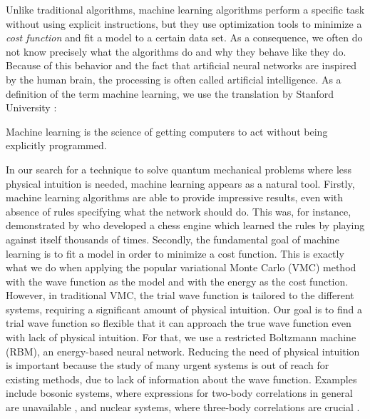 Unlike traditional algorithms, machine learning algorithms perform a specific task without using explicit instructions, but they use optimization tools to minimize a \textit{cost function} and fit a model to a certain data set. As a consequence, we often do not know precisely what the algorithms do and why they behave like they do. Because of this behavior and the fact that artificial neural networks are inspired by the human brain, the processing is often called artificial intelligence. As a definition of the term machine learning, we use the translation by Stanford University \supercite{noauthor_machine_nodate}:

\begin{shadequote}{}
	Machine learning is the science of getting computers to act without being explicitly programmed.
\end{shadequote}

In our search for a technique to solve quantum mechanical problems where less physical intuition is needed, machine learning appears as a natural tool. Firstly, machine learning algorithms are able to provide impressive results, even with absence of rules specifying what the network should do. This was, for instance, demonstrated by \citet{silver2017mastering} who developed a chess engine which learned the rules by playing against itself thousands of times. Secondly, the fundamental goal of machine learning is to fit a model in order to minimize a cost function. This is exactly what we do when applying the popular variational Monte Carlo (VMC) method with the wave function as the model and with the energy as the cost function. However, in traditional VMC, the trial wave function is tailored to the different systems, requiring a significant amount of physical intuition. Our goal is to find a trial wave function so flexible that it can approach the true wave function even with lack of physical intuition. For that, we use a restricted Boltzmann machine (RBM), an energy-based neural network. Reducing the need of physical intuition is important because the study of many urgent systems is out of reach for existing methods, due to lack of information about the wave function. Examples include bosonic systems, where expressions for two-body correlations in general are unavailable \supercite{holzmann_pair_1999}, and nuclear systems, where three-body correlations are crucial \supercite{sauer_three-nucleon_2014}.

